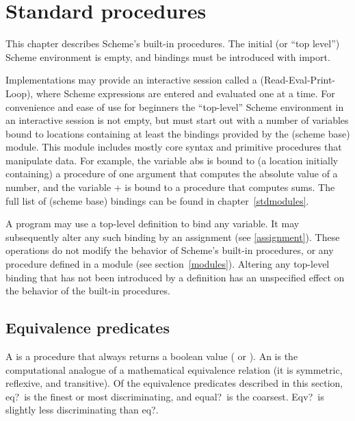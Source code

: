 
\chapter{Standard procedures}
\label{initialenv}
\label{builtinchapter}


This chapter describes Scheme's built-in procedures.  The initial (or
``top level'') Scheme environment is empty, and bindings must be
introduced with {\cf import}.

Implementations may provide an interactive session called a
 (Read-Eval-Print-Loop), where Scheme expressions are
entered and evaluated one at a time.  For convenience and ease of use
for beginners the ``top-level'' Scheme environment in an interactive
session is not empty, but must start out with a number of variables
bound to locations containing at least the bindings provided by the
{\cf(scheme base)} module.  This module includes mostly core syntax
and primitive procedures that manipulate data.  For example, the
variable {\cf abs} is bound to (a location initially containing) a
procedure of one argument that computes the absolute value of a
number, and the variable {\cf +} is bound to a procedure that computes
sums.  The full list of {\cf(scheme base)} bindings can be found in
chapter~\ref{stdmodules}.

A program may use a top-level definition to bind any variable.  It may
subsequently alter any such binding by an assignment (see
\ref{assignment}).  These operations do not modify the behavior of
Scheme's built-in procedures, or any procedure defined in a module
(see section~\ref{modules}).  Altering any top-level binding that has
not been introduced by a definition has an unspecified effect on the
behavior of the built-in procedures.

\section{Equivalence predicates}
\label{equivalencesection}

A  is a procedure that always returns a boolean
value (\schtrue{} or \schfalse).  An  is
the computational analogue of a mathematical equivalence relation (it is
symmetric, reflexive, and transitive).  Of the equivalence predicates
described in this section, {\cf eq?}\ is the finest or most
discriminating, and {\cf equal?}\ is the coarsest.  {\cf Eqv?}\ is
slightly less discriminating than {\cf eq?}.  


